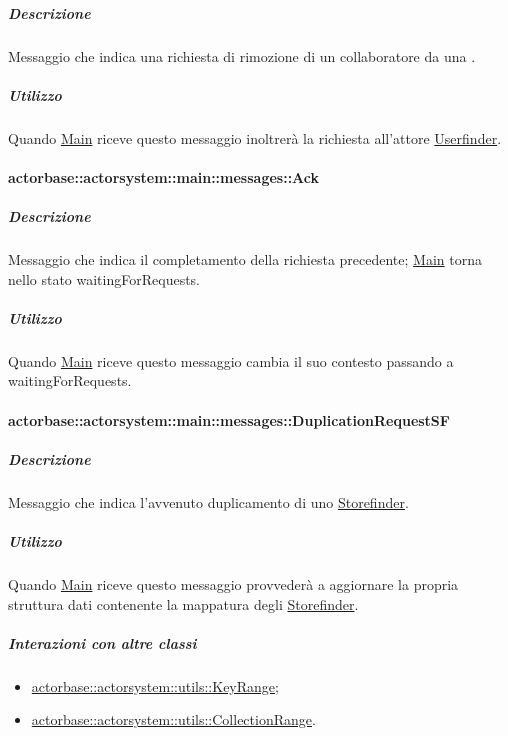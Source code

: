 \documentclass{scalatekids-article}
\begin{document}
\subparagraph{Descrizione}

Messaggio che indica una richiesta di rimozione di un collaboratore da una
.

\subparagraph{Utilizzo}

Quando \hyperref[sec:actorbase::actorsystem::main::Main]{Main}
riceve questo messaggio inoltrerà la richiesta all'attore \hyperref[sec:actorbase::actorsystem::userfinder::Userfinder]{Userfinder}.

\paragraph{actorbase::actorsystem::main::messages::Ack}
\label{sec:actorbase::actorsystem::main::messages::Ack}

\subparagraph{Descrizione}

Messaggio che indica il completamento della richiesta precedente; \hyperref[sec:actorbase::actorsystem::main::Main]{Main} torna nello stato waitingForRequests.

\subparagraph{Utilizzo}

Quando \hyperref[sec:actorbase::actorsystem::main::Main]{Main}
riceve questo messaggio cambia il suo contesto passando a waitingForRequests.

\paragraph{actorbase::actorsystem::main::messages::DuplicationRequestSF}
\label{sec:actorbase::actorsystem::main::messages::DuplicateRequestSF}

\subparagraph{Descrizione}

Messaggio che indica l'avvenuto duplicamento di uno \hyperref[sec:actorbase::actorsystem::storefinder::Storefinder]{Storefinder}.

\subparagraph{Utilizzo}
Quando \hyperref[sec:actorbase::actorsystem::main::Main]{Main}
riceve questo messaggio provvederà a aggiornare la propria struttura dati
contenente la mappatura degli \hyperref[sec:actorbase::actorsystem::storefinder::Storefinder]{Storefinder}.

\subparagraph{Interazioni con altre classi}
\begin{itemize}
\item \hyperref[sec:actorbase::actorsystem::utils::KeyRange]{actorbase::actorsystem::utils::KeyRange};
\item \hyperref[sec:actorbase::actorsystem::utils::CollectionRange]{actorbase::actorsystem::utils::CollectionRange}.
\end{itemize}
\end{document}
